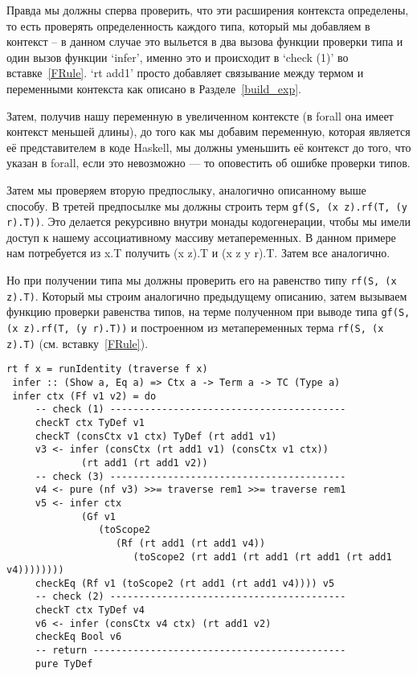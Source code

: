 Правда мы должны сперва проверить, что эти расширения контекста определены, то есть проверять определенность каждого типа, который мы добавляем в контекст -- в данном случае это выльется в два вызова функции проверки типа и один вызов функции `infer', именно это и происходит в `check (1)' во вставке~\ref{FRule}. `rt add1' просто добавляет связывание между термом и переменными контекста как описано в Разделе~\ref{build_exp}.

Затем, получив нашу переменную в увеличенном контексте (в forall она имеет контекст меньшей длины), до того как мы добавим переменную, которая является её представителем в коде Haskell, мы должны уменьшить её контекст до того, что указан в forall, если это невозможно --- то оповестить об ошибке проверки типов.

Затем мы проверяем вторую предпослыку, аналогично описанному выше способу. В третей предпосылке мы должны строить терм \lstinline{gf(S, (x z).rf(T, (y r).T))}. Это делается рекурсивно внутри монады кодогенерации, чтобы мы имели доступ к нашему ассоциативному массиву метапеременных. В данном примере нам потребуется из x.T получить (x z).T и (x z y r).T. Затем все аналогично.

Но при получении типа мы должны проверить его на равенство типу  \lstinline{rf(S, (x z).T)}. Который мы строим аналогично предыдущему описанию, затем вызываем функцию проверки равенства типов, на терме полученном при выводе типа \lstinline{gf(S, (x z).rf(T, (y r).T))} и построенном из метапеременных терма \lstinline{rf(S, (x z).T)} (см. вставку~\ref{FRule}).


\begin{lstlisting}[caption={Искусственный пример случая несоответствия контекстов: контекст t нужно сократить до использования в предпосылке.},label={FRule},captionpos=b, frame=single, float, floatplacement=H]
 rt f x = runIdentity (traverse f x)
 infer :: (Show a, Eq a) => Ctx a -> Term a -> TC (Type a)
 infer ctx (Ff v1 v2) = do
     -- check (1) -----------------------------------------
     checkT ctx TyDef v1
     checkT (consCtx v1 ctx) TyDef (rt add1 v1)
     v3 <- infer (consCtx (rt add1 v1) (consCtx v1 ctx))
             (rt add1 (rt add1 v2))
     -- check (3) -----------------------------------------
     v4 <- pure (nf v3) >>= traverse rem1 >>= traverse rem1
     v5 <- infer ctx
             (Gf v1
                (toScope2
                   (Rf (rt add1 (rt add1 v4))
                      (toScope2 (rt add1 (rt add1 (rt add1 (rt add1 v4))))))))
     checkEq (Rf v1 (toScope2 (rt add1 (rt add1 v4)))) v5
     -- check (2) -----------------------------------------
     checkT ctx TyDef v4
     v6 <- infer (consCtx v4 ctx) (rt add1 v2)
     checkEq Bool v6
     -- return --------------------------------------------
     pure TyDef
\end{lstlisting}


